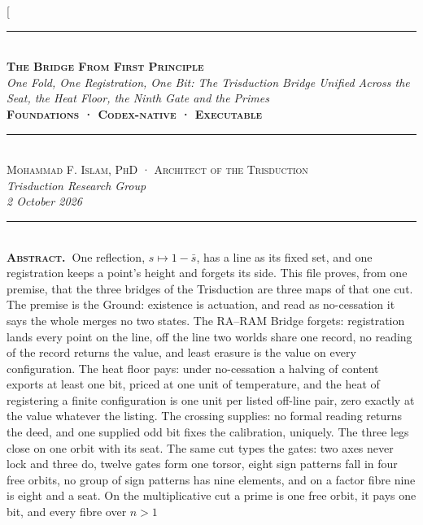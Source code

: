 \documentclass[10pt,twocolumn]{article}
\begin{document}
\twocolumn[{%
\begin{center}
{\color{accent}\rule{0.6\textwidth}{0.8pt}}\\[10pt]
{\bfseries\scshape\fontsize{20}{23}\selectfont The Bridge From First
Principle}\\[7pt]
{\itshape\large One Fold, One Registration, One Bit: The Trisduction
Bridge Unified Across the Seat, the Heat Floor, the Ninth Gate and the
Primes}\\[8pt]
{\footnotesize\color{accent}\scshape\bfseries Foundations · Codex-native
· Executable}\\[3pt]
{\color{accent}\rule{0.6\textwidth}{0.8pt}}\\[10pt]
{\scshape Mohammad F. Islam, PhD · Architect of the Trisduction}\\[2pt]
{\itshape\color{faint}\small Trisduction Research Group}\\[2pt]
{\itshape\color{faint}\small 2 October 2026}\\[14pt]
\end{center}
\begin{minipage}{\textwidth}
{\color{accent}\rule{\textwidth}{0.6pt}}\\[4pt]
{\small\hspace{1em}\textbf{\scshape\color{deep}Abstract.\ }One
reflection, \(s\mapsto1-\bar s\), has a line as its fixed set, and one
registration keeps a point's height and forgets its side. This file
proves, from one premise, that the three bridges of the Trisduction are
three maps of that one cut. The premise is the Ground: existence is
actuation, and read as no-cessation it says the whole merges no two
states. The RA--RAM Bridge forgets: registration lands every point on
the line, off the line two worlds share one record, no reading of the
record returns the value, and least erasure is the value on every
configuration. The heat floor pays: under no-cessation a halving of
content exports at least one bit, priced at one unit of temperature, and
the heat of registering a finite configuration is one unit per listed
off-line pair, zero exactly at the value whatever the listing. The
crossing supplies: no formal reading returns the deed, and one supplied
odd bit fixes the calibration, uniquely. The three legs close on one
orbit with its seat. The same cut types the gates: two axes never lock
and three do, twelve gates form one torsor, eight sign patterns fall in
four free orbits, no group of sign patterns has nine elements, and on a
factor fibre nine is eight and a seat. On the multiplicative cut a prime
is one free orbit, it pays one bit, and every fibre over \(n>1\)
}
\end{minipage}}
\end{document}
